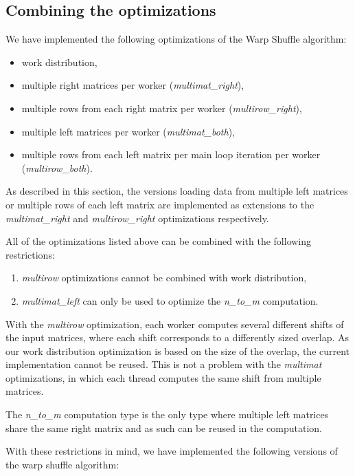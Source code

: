 \subsection{Combining the optimizations}
\label{sec:combining_optimizations}

We have implemented the following optimizations of the Warp Shuffle algorithm:

\begin{itemize}
	\item work distribution,
	\item multiple right matrices per worker (\textit{multimat\_right}),
	\item multiple rows from each right matrix per worker (\textit{multirow\_right}),
	\item multiple left matrices per worker (\textit{multimat\_both}),
	\item multiple rows from each left matrix per main loop iteration per worker (\textit{multirow\_both}).
\end{itemize}

As described in this section, the versions loading data from multiple left matrices or multiple rows of each left matrix are implemented as extensions to the \textit{multimat\_right} and \textit{multirow\_right} optimizations respectively.


All of the optimizations listed above can be combined with the following restrictions:

\begin{enumerate}
	\item \textit{multirow} optimizations cannot be combined with work distribution,
	\item \textit{multimat\_left} can only be used to optimize the \textit{n\_to\_m} computation. 
\end{enumerate}

With the \textit{multirow} optimization, each worker computes several different shifts of the input matrices, where each shift corresponds to a differently sized overlap. As our work distribution optimization is based on the size of the overlap, the current implementation cannot be reused. This is not a problem with the \textit{multimat} optimizations, in which each thread computes the same shift from multiple matrices.

The \textit{n\_to\_m} computation type is the only type where multiple left matrices share the same right matrix and as such can be reused in the computation.


With these restrictions in mind, we have implemented the following versions of the warp shuffle algorithm:

